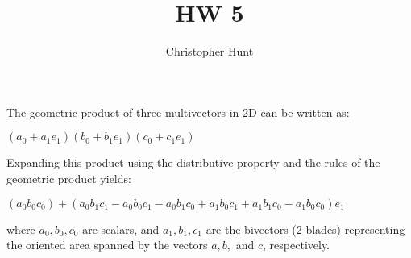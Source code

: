 \documentclass{article}
\title{HW 5}
\author{Christopher Hunt}
\date{}
\begin{document}
The geometric product of three multivectors in 2D can be written as:

$(a_0 + a_1 e_1)(b_0 + b_1 e_1)(c_0 + c_1 e_1)$

Expanding this product using the distributive property and the rules of the geometric product yields:

$(a_0 b_0 c_0) + (a_0 b_1 c_1 - a_0 b_0 c_1 - a_0 b_1 c_0 + a_1 b_0 c_1 + a_1 b_1 c_0 - a_1 b_0 c_0)e_1$

where $a_0, b_0, c_0$ are scalars, and $a_1, b_1, c_1$ are the bivectors (2-blades) representing the oriented area spanned by the vectors $a, b,$ and $c$, respectively.
\end{document}
